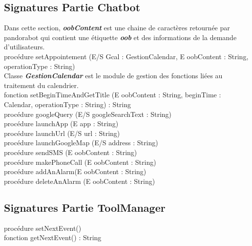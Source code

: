 \subsection{Signatures Partie Chatbot}
Dans cette section, \textbf{\emph{oobContent}} est une chaine de caractères retournée par pandorabot qui contient une étiquette \textbf{\emph{oob}} et des informations de la demande d'utilisateurs.\\
\indent procédure setAppointement (E/S Gcal : GestionCalendar, E oobContent : String, operationType : String)\\
\indent Classe \textbf{\emph{GestionCalendar}} est le module de gestion des fonctions liées au traitement du calendrier.\\
\indent fonction setBeginTimeAndGetTitle (E oobContent : String, beginTime : Calendar, operationType : String) : String\\
\indent procédure googleQuery (E/S googleSearchText : String)\\
\indent procédure launchApp (E app : String)\\
\indent procédure launchUrl (E/S url : String)\\
\indent procédure launchGoogleMap (E/S address : String)\\
\indent procédure sendSMS (E oobContent : String)\\
\indent procédure makePhoneCall (E oobContent : String)\\
\indent procédure addAnAlarm(E oobContent : String)\\
\indent procédure deleteAnAlarm (E oobContent : String)\\

\subsection{Signatures Partie ToolManager}
procédure setNextEvent()\\
\indent fonction getNextEvent() : String\\
\newpage

